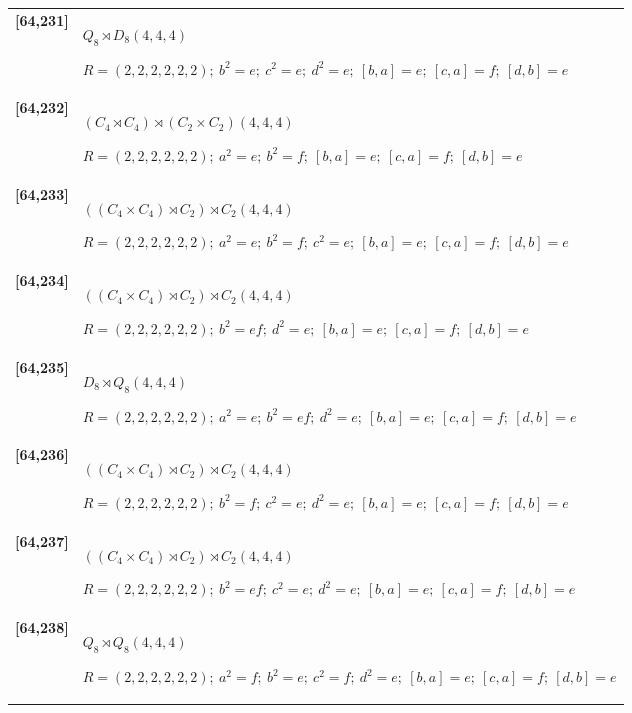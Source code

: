 \documentclass[UTF8,fontset=fandol,11pt,a4paper]{ctexart}
\begin{document}
\begin{longtable}{@{}p{17mm}>{\raggedright\arraybackslash}p{141mm}@{}}
\textbf{[64,231]} & $Q_{8}\rtimes D_{8}$\quad $(4,4,4)$\par\(R=(2,2,2,2,2,2);\allowbreak\ b^{2}=e;\allowbreak\ c^{2}=e;\allowbreak\ d^{2}=e;\allowbreak\ [b,a]=e;\allowbreak\ [c,a]=f;\allowbreak\ [d,b]=e\)\\[3pt]

\textbf{[64,232]} & $(C_{4}\rtimes C_{4})\rtimes (C_{2}\times C_{2})$\quad $(4,4,4)$\par\(R=(2,2,2,2,2,2);\allowbreak\ a^{2}=e;\allowbreak\ b^{2}=f;\allowbreak\ [b,a]=e;\allowbreak\ [c,a]=f;\allowbreak\ [d,b]=e\)\\[3pt]

\textbf{[64,233]} & $((C_{4}\times C_{4})\rtimes C_{2})\rtimes C_{2}$\quad $(4,4,4)$\par\(R=(2,2,2,2,2,2);\allowbreak\ a^{2}=e;\allowbreak\ b^{2}=f;\allowbreak\ c^{2}=e;\allowbreak\ [b,a]=e;\allowbreak\ [c,a]=f;\allowbreak\ [d,b]=e\)\\[3pt]

\textbf{[64,234]} & $((C_{4}\times C_{4})\rtimes C_{2})\rtimes C_{2}$\quad $(4,4,4)$\par\(R=(2,2,2,2,2,2);\allowbreak\ b^{2}=ef;\allowbreak\ d^{2}=e;\allowbreak\ [b,a]=e;\allowbreak\ [c,a]=f;\allowbreak\ [d,b]=e\)\\[3pt]

\textbf{[64,235]} & $D_{8}\rtimes Q_{8}$\quad $(4,4,4)$\par\(R=(2,2,2,2,2,2);\allowbreak\ a^{2}=e;\allowbreak\ b^{2}=ef;\allowbreak\ d^{2}=e;\allowbreak\ [b,a]=e;\allowbreak\ [c,a]=f;\allowbreak\ [d,b]=e\)\\[3pt]

\textbf{[64,236]} & $((C_{4}\times C_{4})\rtimes C_{2})\rtimes C_{2}$\quad $(4,4,4)$\par\(R=(2,2,2,2,2,2);\allowbreak\ b^{2}=f;\allowbreak\ c^{2}=e;\allowbreak\ d^{2}=e;\allowbreak\ [b,a]=e;\allowbreak\ [c,a]=f;\allowbreak\ [d,b]=e\)\\[3pt]

\textbf{[64,237]} & $((C_{4}\times C_{4})\rtimes C_{2})\rtimes C_{2}$\quad $(4,4,4)$\par\(R=(2,2,2,2,2,2);\allowbreak\ b^{2}=ef;\allowbreak\ c^{2}=e;\allowbreak\ d^{2}=e;\allowbreak\ [b,a]=e;\allowbreak\ [c,a]=f;\allowbreak\ [d,b]=e\)\\[3pt]

\textbf{[64,238]} & $Q_{8}\rtimes Q_{8}$\quad $(4,4,4)$\par\(R=(2,2,2,2,2,2);\allowbreak\ a^{2}=f;\allowbreak\ b^{2}=e;\allowbreak\ c^{2}=f;\allowbreak\ d^{2}=e;\allowbreak\ [b,a]=e;\allowbreak\ [c,a]=f;\allowbreak\ [d,b]=e\)\\[3pt]


\end{longtable}
\end{document}

